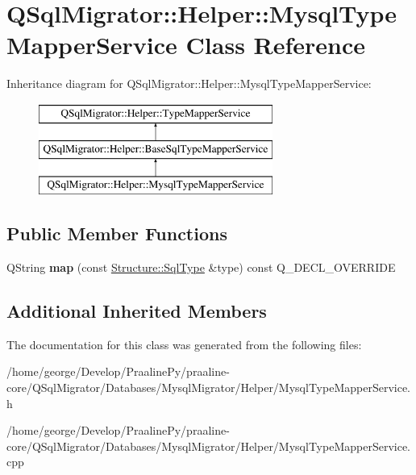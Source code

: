\hypertarget{class_q_sql_migrator_1_1_helper_1_1_mysql_type_mapper_service}{}\section{Q\+Sql\+Migrator\+:\+:Helper\+:\+:Mysql\+Type\+Mapper\+Service Class Reference}
\label{class_q_sql_migrator_1_1_helper_1_1_mysql_type_mapper_service}
Inheritance diagram for Q\+Sql\+Migrator\+:\+:Helper\+:\+:Mysql\+Type\+Mapper\+Service\+:\begin{figure}[H]
\begin{center}
\leavevmode
\includegraphics[height=3.000000cm]{class_q_sql_migrator_1_1_helper_1_1_mysql_type_mapper_service}
\end{center}
\end{figure}
\subsection*{Public Member Functions}
\begin{DoxyCompactItemize}
\item 
\mbox{\label{class_q_sql_migrator_1_1_helper_1_1_mysql_type_mapper_service_aec040c5979da2c431b0895df64bbb058}} 
Q\+String {\bfseries map} (const \hyperlink{class_q_sql_migrator_1_1_structure_1_1_sql_type}{Structure\+::\+Sql\+Type} \&type) const Q\+\_\+\+D\+E\+C\+L\+\_\+\+O\+V\+E\+R\+R\+I\+DE
\end{DoxyCompactItemize}
\subsection*{Additional Inherited Members}


The documentation for this class was generated from the following files\+:\begin{DoxyCompactItemize}
\item 
/home/george/\+Develop/\+Praaline\+Py/praaline-\/core/\+Q\+Sql\+Migrator/\+Databases/\+Mysql\+Migrator/\+Helper/Mysql\+Type\+Mapper\+Service.\+h\item 
/home/george/\+Develop/\+Praaline\+Py/praaline-\/core/\+Q\+Sql\+Migrator/\+Databases/\+Mysql\+Migrator/\+Helper/Mysql\+Type\+Mapper\+Service.\+cpp\end{DoxyCompactItemize}
